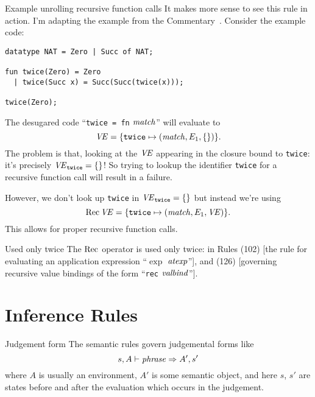 \begin{example}{Example unrolling recursive function calls}
It makes more sense to see this rule in action. I'm adapting the example
from the Commentary~\cite[pp.1--12]{milner1991commentary}. Consider the
example code:
\begin{Verbatim}
datatype NAT = Zero | Succ of NAT;

fun twice(Zero) = Zero
  | twice(Succ x) = Succ(Succ(twice(x)));

twice(Zero);
\end{Verbatim}
The desugared code ``\texttt{twice = fn} $\textit{match\/}$'' will evaluate to
\begin{equation*}
\textit{V\kern-.05emE\/} = \{\texttt{twice}\mapsto(\textit{match\/},E_{1},\{\})\}.
\end{equation*}
The problem is that, looking at the $\textit{V\kern-.05emE\/}$ appearing in the closure bound
to \texttt{twice}: it's precisely $\textit{V\kern-.05emE\/}_{\mathtt{twice}}=\{\}$! So trying to lookup
the identifier \texttt{twice} for a recursive function call will result
in a failure.

However, we don't look up \texttt{twice} in $\textit{V\kern-.05emE\/}_{\mathtt{twice}}=\{\}$
but instead we're using
\begin{equation*}
\mathop{\rm Rec}\nolimits\textit{V\kern-.05emE\/} = \{\texttt{twice}\mapsto(\textit{match\/},E_{1},\textit{V\kern-.05emE\/})\}.
\end{equation*}
This allows for proper recursive function calls.
\end{example}

\begin{remark}{Used only twice}
The $\mathop{\rm Rec}\nolimits$ operator is used only twice: in Rules (102) [the rule for
  evaluating an application expression ``$\exp$ $\textit{atexp\/}$''], and (126)
[governing recursive value bindings of the form ``\texttt{rec} $\textit{valbind\/}$''].
\end{remark}

\section{Inference Rules}

\begin{definition}{Judgement form}
The semantic rules govern judgemental forms like
\begin{equation*}
s,A\vdash\textit{phrase\/}\Rightarrow A',s'
\end{equation*}
where $A$ is usually an environment, $A'$ is some semantic object, and
here $s$, $s'$ are states before and after the evaluation which occurs
in the judgement.
\end{definition}

